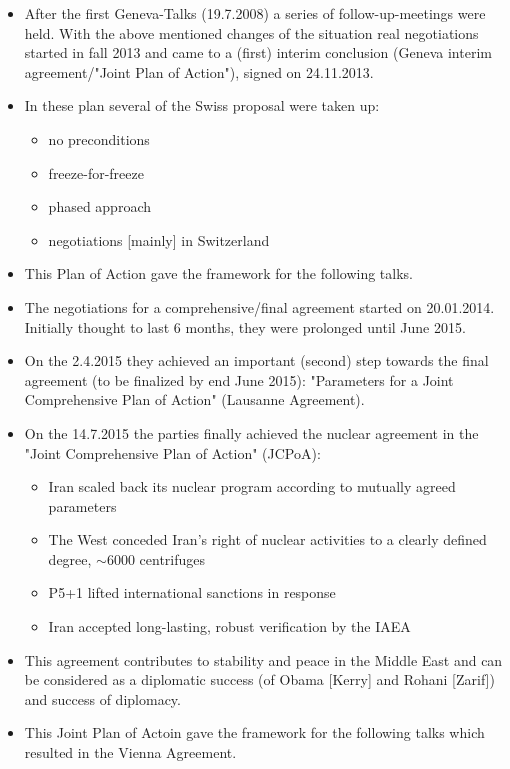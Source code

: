 \begin{itemize}
    \item After the first Geneva-Talks (19.7.2008) a series of follow-up-meetings
        were held. With the above mentioned changes of the situation real negotiations
        started in fall 2013 and came to a (first) interim conclusion (Geneva interim
        agreement/"Joint Plan of Action"), signed on 24.11.2013.
    \item In these plan several of the Swiss proposal were taken up:
        \begin{itemize}
            \item no preconditions
            \item freeze-for-freeze
            \item phased approach
            \item negotiations [mainly] in Switzerland
        \end{itemize}
    \item This Plan of Action gave the framework for the following talks.
    \item The negotiations for a comprehensive/final agreement started on
        20.01.2014. Initially thought to last 6 months, they were prolonged
        until June 2015.
    \item On the 2.4.2015 they achieved an important (second) step towards the
        final agreement (to be finalized by end June 2015): "Parameters for a
        Joint Comprehensive Plan of Action" (Lausanne Agreement).
    \item On the 14.7.2015 the parties finally achieved the nuclear agreement
        in the "Joint Comprehensive Plan of Action" (JCPoA):
        \begin{itemize}
            \item Iran scaled back its nuclear program according to mutually
                agreed parameters
            \item The West conceded Iran's right of nuclear activities to a
                clearly defined degree, $\sim 6000$ centrifuges
            \item P5+1 lifted international sanctions in response
            \item Iran accepted long-lasting, robust verification by the IAEA
        \end{itemize}
    \item This agreement contributes to stability and peace in the Middle
        East and can be considered as a diplomatic success (of Obama [Kerry]
        and Rohani [Zarif]) and success of diplomacy.
    \item This Joint Plan of Actoin gave the framework for the following talks
        which resulted in the Vienna Agreement.
\end{itemize}

